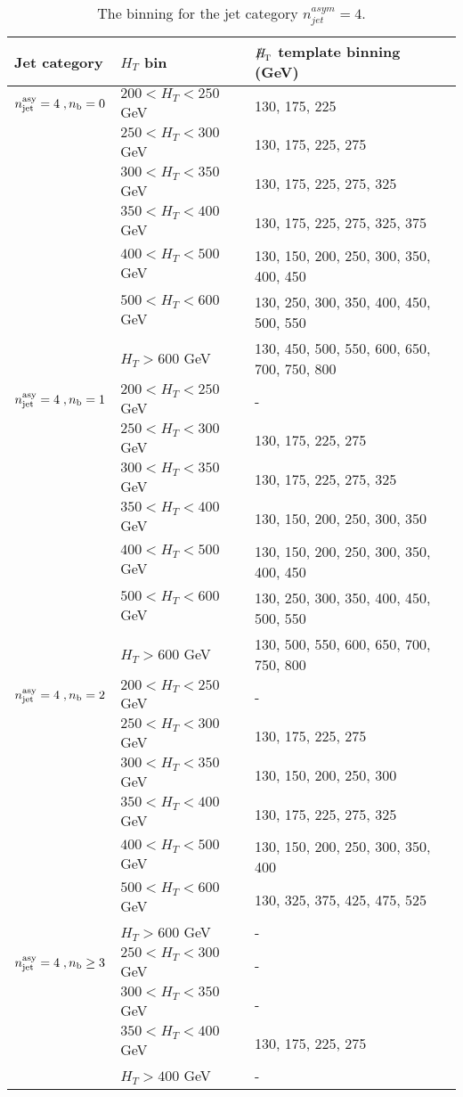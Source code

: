 \begin{table}[h!]
  \scriptsize
  \centering
  \caption{The \MHT binning for the jet category $n_{jet}^{asym} = 4$. 
  \label{tab:mhtBins_eq4a}}
  \begin{tabular}{ lll }
    Jet category & $H_{T}$ bin & $\MHT$ template binning (GeV) \\ \hline

    \hline
    $n_{\text{jet}}^{\mathrm{asy}}  =   4 \;, n_{\text{b}} = 0 $ & $200 < H_{T} < 250$ GeV & 130, 175, 225 \\ 
     & $250 < H_{T} < 300$ GeV & 130, 175, 225, 275 \\ 
     & $300 < H_{T} < 350$ GeV & 130, 175, 225, 275, 325 \\ 
     & $350 < H_{T} < 400$ GeV & 130, 175, 225, 275, 325, 375 \\ 
     & $400 < H_{T} < 500$ GeV & 130, 150, 200, 250, 300, 350, 400, 450 \\ 
     & $500 < H_{T} < 600$ GeV & 130, 250, 300, 350, 400, 450, 500, 550 \\ 
     & $H_{T} > 600$ GeV & 130, 450, 500, 550, 600, 650, 700, 750, 800 \\ 
    \hline
    $n_{\text{jet}}^{\mathrm{asy}}  =   4 \;, n_{\text{b}} = 1$ & $200 < H_{T} < 250$ GeV & - \\ 
     & $250 < H_{T} < 300$ GeV & 130, 175, 225, 275 \\ 
     & $300 < H_{T} < 350$ GeV & 130, 175, 225, 275, 325 \\ 
     & $350 < H_{T} < 400$ GeV & 130, 150, 200, 250, 300, 350 \\ 
     & $400 < H_{T} < 500$ GeV & 130, 150, 200, 250, 300, 350, 400, 450 \\ 
     & $500 < H_{T} < 600$ GeV & 130, 250, 300, 350, 400, 450, 500, 550 \\ 
     & $H_{T} > 600$ GeV & 130, 500, 550, 600, 650, 700, 750, 800 \\ 
    \hline
    $n_{\text{jet}}^{\mathrm{asy}}  =   4 \;, n_{\text{b}} = 2$ & $200 < H_{T} < 250$ GeV & - \\ 
     & $250 < H_{T} < 300$ GeV & 130, 175, 225, 275 \\ 
     & $300 < H_{T} < 350$ GeV & 130, 150, 200, 250, 300 \\ 
     & $350 < H_{T} < 400$ GeV & 130, 175, 225, 275, 325 \\ 
     & $400 < H_{T} < 500$ GeV & 130, 150, 200, 250, 300, 350, 400 \\ 
     & $500 < H_{T} < 600$ GeV & 130, 325, 375, 425, 475, 525 \\ 
     & $H_{T} > 600$ GeV & - \\ 
    \hline
    $n_{\text{jet}}^{\mathrm{asy}}  =   4 \;, n_{\text{b}} \geq 3$ & $250 < H_{T} < 300$ GeV & - \\ 
     & $300 < H_{T} < 350$ GeV & - \\ 
     & $350 < H_{T} < 400$ GeV & 130, 175, 225, 275 \\ 
     & $H_{T} > 400$ GeV & - \\ 

  \end{tabular}
\end{table}



